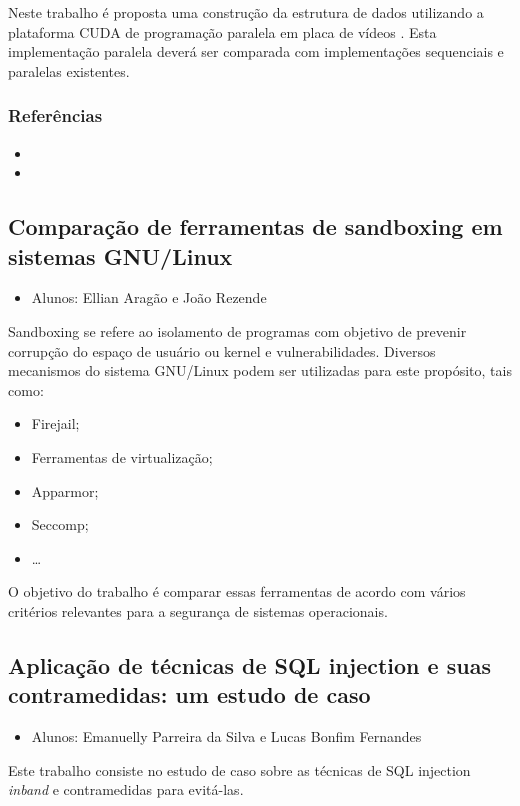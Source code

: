 \documentclass{article}
\newcommand*{\nsubsection}[1]{
    \subsection{#1}
}
\begin{document}
Neste trabalho é proposta uma construção da estrutura de dados utilizando a plataforma CUDA de programação paralela em placa de vídeos . Esta implementação paralela deverá ser comparada com implementações sequenciais e paralelas existentes.

\subsubsection*{Referências}

\begin{itemize}
	\item {}
	\item {}
\end{itemize}

\nsubsection{Comparação de ferramentas de sandboxing em sistemas GNU/Linux}

\begin{itemize}
	\item Alunos: Ellian Aragão e João Rezende
\end{itemize}
Sandboxing se refere ao isolamento de programas com objetivo de prevenir corrupção do espaço de usuário ou kernel e vulnerabilidades. Diversos mecanismos do sistema GNU/Linux podem ser utilizadas para este propósito, tais como: 
\begin{itemize}
	\item Firejail;
	\item Ferramentas de virtualização;
	\item Apparmor;
	\item Seccomp;
	\item \ldots
\end{itemize}



O objetivo do trabalho é comparar essas ferramentas de acordo com vários critérios relevantes para a segurança de sistemas operacionais.

\nsubsection{Aplicação de técnicas de SQL injection e suas contramedidas: um estudo de caso}

\begin{itemize}
	\item Alunos: Emanuelly Parreira da Silva e Lucas Bonfim Fernandes
\end{itemize}


Este trabalho consiste no estudo de caso sobre as técnicas de SQL injection {\it inband} e contramedidas para evitá-las. 
\end{document}
